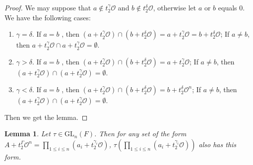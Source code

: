 \documentclass{amsart}
\newtheorem{lemma}[theorem]{Lemma}
\theoremstyle{definition}
\theoremstyle{remark}
\numberwithin{equation}{section}
\def  \GL        {\mathrm{GL}}
\def  \co       {\mathcal{O}}
\begin{document}
\begin{proof}
	 We may suppose that $ a \notin t_2^{\gamma} \co$ and $b \notin t_2^{\delta} \co$, otherwise let $a$ or $b$ equals $0$.    We have the following cases:
	 \begin{enumerate}
	 	\item  $\gamma = \delta$.  If  $a =b$ , then $(a+t_2^{\gamma} \co) \cap  (b+t_2^{\delta} \co)    =a+t_2^{\gamma} \co =b+t_2^{\delta} \co$; If $a \neq b$, then $a+t_2^{\gamma} \co  \cap a+t_2^{\gamma} \co= \emptyset$.  
	 	\item  $\gamma  >  \delta$.    If  $a =b$ , then $(a+t_2^{\gamma} \co) \cap  (b+t_2^{\delta} \co)    =a+t_2^{\gamma} \co$; If $a \neq b$, then $(a+t_2^{\gamma} \co)  \cap( a+t_2^{\gamma} \co )= \emptyset$. 
	 	\item  $\gamma  <  \delta$.    If  $a =b$ , then $(a+t_2^{\gamma} \co) \cap  (b+t_2^{\delta} \co)    =b+t_2^{\delta} \co^n $; If $a \neq b$, then $(a+t_2^{\gamma} \co)  \cap( a+t_2^{\gamma} \co)= \emptyset$.
	 \end{enumerate}
	  Then we get the lemma.
\end{proof}
\begin{lemma}\label{linearinvariant}
	Let $\tau \in \GL_n(F)$. Then for any  set  of the form $A +t_2^{\Gamma}\co^n =\prod_{1 \leq i \leq n} (a_i + t_2^{\gamma_{i}} \co)$, $\tau (\prod_{1 \leq i \leq n} (a_i + t_2^{\gamma_{i}} \co))$ also has this form.
\end{lemma}
\end{document}
